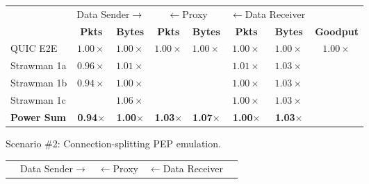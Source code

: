 \begin{figure}[h]
\begin{subfigure}{\columnwidth}
  \setlength{\tabcolsep}{2pt}
  \footnotesize
  \centering
  \begin{tabular}{lccccccc}
    \toprule
    & \multicolumn{2}{c}{Data Sender$\rightarrow$} & \multicolumn{2}{c}{$\leftarrow$Proxy} & \multicolumn{2}{c}{$\leftarrow$Data Receiver} & \\
    & \bf Pkts & \bf Bytes & \bf Pkts & \bf Bytes & \bf Pkts & \bf Bytes & \bf Goodput \\
    \midrule
    QUIC E2E & $1.00\times$ & $1.00\times$ & $1.00\times$ & $1.00\times$ & $1.00\times$ & $1.00\times$ & $1.00\times$ \\
    Strawman 1a & $0.96\times$ & $1.01\times$ & \cellcolor{LighterRed}{$2.02\times$} & \cellcolor{LightestRed}{$1.56\times$} & $1.01\times$ & $1.03\times$ & \cellcolor{LighterGreen}{$3.33\times$} \\
    Strawman 1b & $0.94\times$ & $1.00\times$ & \cellcolor{LighterRed}{$2.00\times$} & \cellcolor{LightestRed}{$1.78\times$} & $1.00\times$ & $1.03\times$ & \cellcolor{LightGreen}{$3.53\times$} \\
    Strawman 1c & \cellcolor{LightestRed}{$1.83\times$} & $1.06\times$ & \cellcolor{LighterRed}{$2.01\times$} & \cellcolor{LightestRed}{$1.83\times$} & $1.00\times$ & $1.03\times$ & \cellcolor{LightGreen}{$3.46\times$} \\
    \bf \textcolor{black!50!blue}{Power Sum}   & \textcolor{black!50!blue}{\bf 0.94$\times$} & \textcolor{black!50!blue}{\bf 1.00$\times$} & \textcolor{black!50!blue}{\bf 1.03$\times$} & \textcolor{black!50!blue}{\bf 1.07$\times$} & \textcolor{black!50!blue}{\bf 1.00$\times$} & \textcolor{black!50!blue}{\bf 1.03$\times$} & \cellcolor{LightGreen}{\textcolor{black!50!blue}{\bf 3.55$\times$}} \\
    \bottomrule
  \end{tabular}
  \caption{Scenario \#2: Connection-splitting PEP emulation.}
  \label{tab:packet-overhead:retx}
\end{subfigure}
\begin{subfigure}{\columnwidth}
  \setlength{\tabcolsep}{2pt}
  \footnotesize
  \centering
  \begin{tabular}{lccccccc}
    \toprule
    & \multicolumn{2}{c}{Data Sender$\rightarrow$} & \multicolumn{2}{c}{$\leftarrow$Proxy} & \multicolumn{2}{c}{$\leftarrow$Data Receiver} & \\

\end{tabular}
\end{subfigure}
\end{figure}
